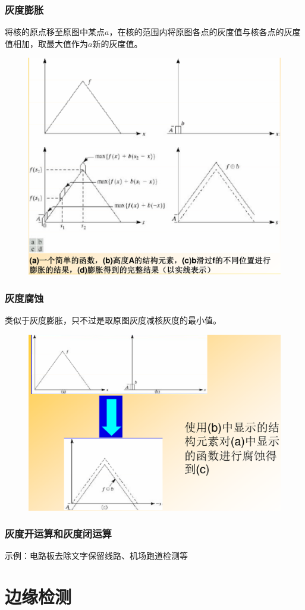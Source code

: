 \documentclass[11pt]{article}
\begin{document}
\subsubsection{灰度膨胀}
将核的原点移至原图中某点$a$，在核的范围内将原图各点的灰度值与核各点的灰度值相加，取最大值作为$a$新的灰度值。
\begin{figure}[htb]
    \centering
    \includegraphics[scale=0.1]{imgs/gray_dilate.png}
\end{figure}

\subsubsection{灰度腐蚀}
类似于灰度膨胀，只不过是取原图灰度减核灰度的最小值。
\begin{figure}[htb]
    \centering
    \includegraphics[scale=0.1]{imgs/gray_erode.png}
\end{figure}

\subsubsection{灰度开运算和灰度闭运算}
示例：电路板去除文字保留线路、机场跑道检测等


\section{边缘检测}
\end{document}
